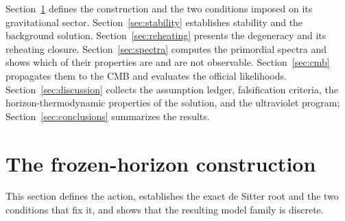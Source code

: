 \documentclass[aps,prd,twocolumn,superscriptaddress,nofootinbib,longbibliography]{revtex4-2}
\begin{document}
Section~\ref{sec:construction} defines the construction and the two
conditions imposed on its gravitational sector.
Section~\ref{sec:stability} establishes stability and the background
solution. Section~\ref{sec:reheating} presents the degeneracy and its
reheating closure. Section~\ref{sec:spectra} computes the primordial spectra
and shows which of their properties are and are not observable.
Section~\ref{sec:cmb} propagates them to the CMB and evaluates the official
likelihoods. Section~\ref{sec:discussion} collects the assumption ledger,
falsification criteria, the horizon-thermodynamic properties of the
solution, and the ultraviolet program;
Section~\ref{sec:conclusions} summarizes the results.

\section{The frozen-horizon construction}
\label{sec:construction}
This section defines the action, establishes the exact de Sitter root and the
two conditions that fix it, and shows that the resulting model family is
discrete.
\end{document}
